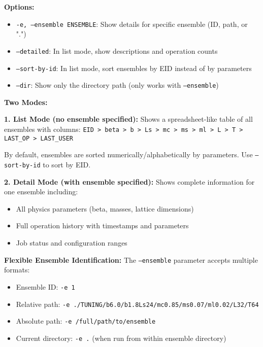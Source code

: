 \documentclass{article}
\begin{document}
\textbf{Options:}
\begin{itemize}
\item \texttt{-e, --ensemble ENSEMBLE}: Show details for specific ensemble (ID, path, or ".")
\item \texttt{--detailed}: In list mode, show descriptions and operation counts
\item \texttt{--sort-by-id}: In list mode, sort ensembles by EID instead of by parameters
\item \texttt{--dir}: Show only the directory path (only works with \texttt{--ensemble})
\end{itemize}

\textbf{Two Modes:}

\textbf{1. List Mode (no ensemble specified):}
Shows a spreadsheet-like table of all ensembles with columns:
\texttt{EID > beta > b > Ls > mc > ms > ml > L > T > LAST\_OP > LAST\_USER}

By default, ensembles are sorted numerically/alphabetically by parameters. Use \texttt{--sort-by-id} to sort by EID.

\textbf{2. Detail Mode (with ensemble specified):}
Shows complete information for one ensemble including:
\begin{itemize}
\item All physics parameters (beta, masses, lattice dimensions)
\item Full operation history with timestamps and parameters
\item Job status and configuration ranges
\end{itemize}

\textbf{Flexible Ensemble Identification:}
The \texttt{--ensemble} parameter accepts multiple formats:
\begin{itemize}
\item Ensemble ID: \texttt{-e 1}
\item Relative path: \texttt{-e ./TUNING/b6.0/b1.8Ls24/mc0.85/ms0.07/ml0.02/L32/T64}
\item Absolute path: \texttt{-e /full/path/to/ensemble}
\item Current directory: \texttt{-e .} (when run from within ensemble directory)
\end{itemize}
\end{document}
